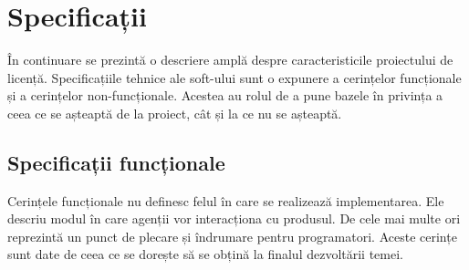 \section{Specificații}
În continuare se prezintă o descriere amplă despre caracteristicile proiectului de licență. Specificațiile tehnice ale soft-ului sunt o expunere a cerințelor funcționale și a cerințelor non-funcționale. Acestea au rolul de a pune bazele în privința a ceea ce se așteaptă de la proiect, cât și la ce nu se așteaptă.

\subsection{Specificații funcționale}

Cerințele funcționale nu definesc felul în care se realizează implementarea. Ele descriu modul în care agenții vor interacționa cu produsul. De cele mai multe ori reprezintă un punct de plecare și îndrumare pentru programatori. Aceste cerințe sunt date de ceea ce se dorește să se obțină la finalul dezvoltării temei.

